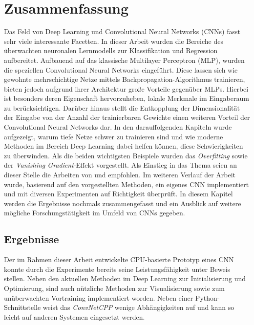 \chapter{Zusammenfassung}
Das Feld von Deep Learning und Convolutional Neural Networks (CNNs) fasst sehr viele interessante Facetten. In dieser Arbeit wurden die Bereiche des überwachten neuronalen Lernmodells zur Klassifikation und Regression aufbereitet. Aufbauend auf das klassische Multilayer Perceptron (MLP), wurden die speziellen Convolutional Neural Networks eingeführt. Diese lassen sich wie gewohnte mehrschichtige Netze mittels Backpropagation-Algorithmus trainieren, bieten jedoch aufgrund ihrer Architektur große Vorteile gegenüber MLPs. Hierbei ist besonders deren Eigenschaft hervorzuheben, lokale Merkmale im Eingaberaum zu berücksichtigen. Darüber hinaus stellt die Entkopplung der Dimensionalität der Eingabe von der Anzahl der trainierbaren Gewichte einen weiteren Vorteil der Convolutional Neural Networks dar. In den darauffolgenden Kapiteln wurde aufgezeigt, warum tiefe Netze schwer zu trainieren sind und wie moderne Methoden im Bereich Deep Learning dabei helfen können, diese Schwierigkeiten zu überwinden. Als die beiden wichtigsten Beispiele wurden das \textit{Overfitting} sowie der \textit{Vanishing Gradient}-Effekt vorgestellt. Als Einstieg in das Thema seien an dieser Stelle die Arbeiten von \cite{Bengio2009} und \cite{Bengio2012} empfohlen. Im weiteren Verlauf der Arbeit wurde, basierend auf den vorgestellten Methoden, ein eigenes CNN implementiert und mit diversen Experimenten auf Richtigkeit überprüft. 
In diesem Kapitel werden die Ergebnisse nochmals zusammengefasst und ein Ausblick auf weitere mögliche Forschungstätigkeit im Umfeld von CNNs gegeben.
							

\section{Ergebnisse}
Der im Rahmen dieser Arbeit entwickelte CPU-basierte Prototyp eines CNN konnte durch die Experimente bereits seine Leistungsfähigkeit unter Beweis stellen. Neben den aktuellen Methoden im Deep Learning zur Initialisierung und Optimierung, sind auch nützliche Methoden zur Visualisierung sowie zum unüberwachten Vortraining implementiert worden. Neben einer Python-Schnittstelle weist das \textit{ConvNetCPP} wenige Abhängigkeiten auf und kann so leicht auf anderen Systemen eingesetzt werden.

